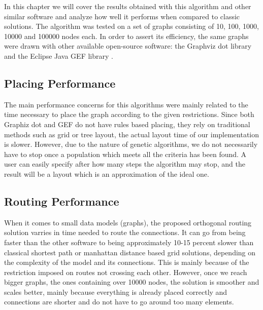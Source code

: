 \label{chap:results}

In this chapter we will cover the results obtained with this algorithm and
other similar software and analyze how well it performs when compared to
classic solutions. The algorithm was tested on a set of graphs consisting of 
10, 100, 1000, 10000 and 100000 nodes each. In order to assert its efficiency, 
the same graphs were drawn with other available open-source software: the Graphviz
dot library \cite{gansner2009drawing} and the Eclipse Java GEF library \cite{rubel2011eclipse}.

\subsection{Placing Performance}

The main performance concerns for this algorithms were mainly related to the 
time necessary to place the graph according to the given restrictions. Since 
both Graphiz dot and GEF do not have rules based placing, they rely on 
traditional methods such as grid or tree layout, the actual layout time of our 
implementation is slower. However, due to the nature of genetic algorithms, we 
do not necessarily have to stop once a population which meets all the criteria 
has been found. A user can easily specify after how many steps the algorithm may 
stop, and the result will be a layout which is an approximation of the ideal one.

\subsection{Routing Performance}

When it comes to small data models (graphs), the proposed orthogonal routing 
solution varries in time needed to route the connections. It can go from being 
faster than the other software to being approximately 10-15 percent slower than 
classical shortest path or manhattan distance based grid solutions, depending on 
the complexity of the model and its connections. This is mainly because of the 
restriction imposed on routes not crossing each other. However, once we reach 
bigger graphs, the ones containing over 10000 nodes, the solution is smoother and
scales better, mainly because everything is already placed correctly and connections 
are shorter and do not have to go around too many elements.
